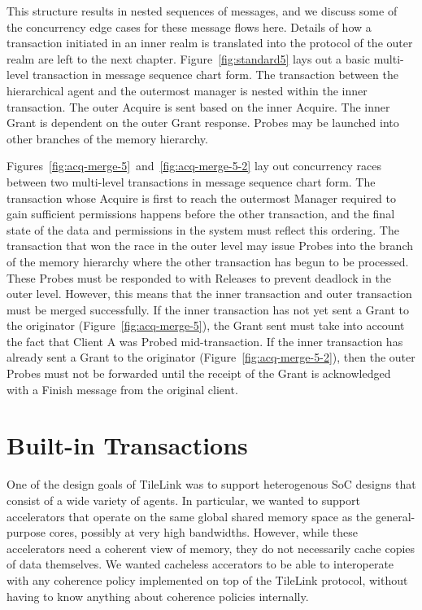 This structure results in nested sequences of messages, and we discuss some of the concurrency edge cases for these message flows here.
Details of how a transaction initiated in an inner realm is translated into the protocol of the outer realm are left to the next chapter.
Figure~\ref{fig:standard5} lays out a basic multi-level transaction in message sequence chart form.
The transaction between the hierarchical agent and the outermost manager is nested within the inner transaction.
The outer Acquire is sent based on the inner Acquire. 
The inner Grant is dependent on the outer Grant response.
Probes may be launched into other branches of the memory hierarchy.

Figures~\ref{fig:acq-merge-5}~and~\ref{fig:acq-merge-5-2} lay out concurrency races between two multi-level transactions in message sequence chart form.
The transaction whose Acquire is first to reach the outermost Manager required to gain sufficient permissions happens before the other transaction,
and the final state of the data and permissions in the system must reflect this ordering.
The transaction that won the race in the outer level may issue Probes into the branch of the memory hierarchy where the other transaction has begun to be processed.
These Probes must be responded to with Releases to prevent deadlock in the outer level.
However, this means that the inner transaction and outer transaction must be merged successfully.
If the inner transaction has not yet sent a Grant to the originator (Figure~\ref{fig:acq-merge-5}),
the Grant sent must take into account the fact that Client A was Probed mid-transaction.
If the inner transaction has already sent a Grant to the originator (Figure~\ref{fig:acq-merge-5-2}),
then the outer Probes must not be forwarded until the receipt of the Grant is acknowledged with a Finish message from the original client.

\section{Built-in Transactions}
\label{s.uncached}

One of the design goals of TileLink was to support heterogenous SoC designs that consist of a wide variety of agents.
In particular, we wanted to support accelerators that operate on the same global shared memory space as the general-purpose cores, possibly at very high bandwidths.
However, while these accelerators need a coherent view of memory, they do not necessarily cache copies of data themselves.
We wanted cacheless accerators to be able to interoperate with any coherence policy implemented on top of the TileLink protocol, without having to know anything about coherence policies internally.

